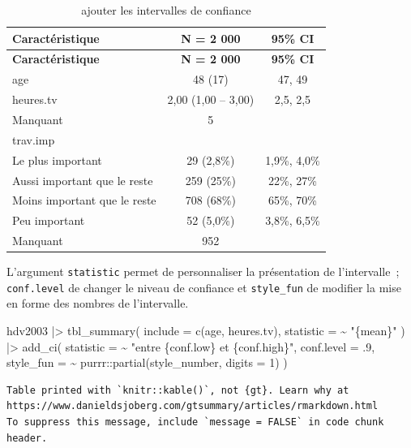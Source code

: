 \documentclass[
  letterpaper,
  DIV=11,
  numbers=noendperiod,
  oneside]{scrreprt}
\newenvironment{Shaded}{\begin{snugshade}}{\end{snugshade}}
\newcommand{\AttributeTok}[1]{\textcolor[rgb]{0.40,0.45,0.13}{#1}}
\newcommand{\DecValTok}[1]{\textcolor[rgb]{0.68,0.00,0.00}{#1}}
\newcommand{\FunctionTok}[1]{\textcolor[rgb]{0.28,0.35,0.67}{#1}}
\newcommand{\NormalTok}[1]{\textcolor[rgb]{0.00,0.23,0.31}{#1}}
\newcommand{\SpecialCharTok}[1]{\textcolor[rgb]{0.37,0.37,0.37}{#1}}
\newcommand{\StringTok}[1]{\textcolor[rgb]{0.13,0.47,0.30}{#1}}
\begin{document}
\hypertarget{tbl-add_ci}{}
\begin{longtable}[]{@{}lcc@{}}
\caption{\label{tbl-add_ci}ajouter les intervalles de
confiance}\tabularnewline
\toprule()
\textbf{Caractéristique} & \textbf{N = 2 000} & \textbf{95\% CI} \\
\midrule()
\endfirsthead
\toprule()
\textbf{Caractéristique} & \textbf{N = 2 000} & \textbf{95\% CI} \\
\midrule()
\endhead
age & 48 (17) & 47, 49 \\
heures.tv & 2,00 (1,00 -- 3,00) & 2,5, 2,5 \\
Manquant & 5 & \\
trav.imp & & \\
Le plus important & 29 (2,8\%) & 1,9\%, 4,0\% \\
Aussi important que le reste & 259 (25\%) & 22\%, 27\% \\
Moins important que le reste & 708 (68\%) & 65\%, 70\% \\
Peu important & 52 (5,0\%) & 3,8\%, 6,5\% \\
Manquant & 952 & \\
\bottomrule()
\end{longtable}

L'argument \texttt{statistic} permet de personnaliser la présentation de
l'intervalle~; \texttt{conf.level} de changer le niveau de confiance et
\texttt{style\_fun} de modifier la mise en forme des nombres de
l'intervalle.

\begin{Shaded}
\begin{Highlighting}[]
\NormalTok{hdv2003 }\SpecialCharTok{|\textgreater{}}
  \FunctionTok{tbl\_summary}\NormalTok{(}
    \AttributeTok{include =} \FunctionTok{c}\NormalTok{(age, heures.tv),}
    \AttributeTok{statistic =} \SpecialCharTok{\textasciitilde{}} \StringTok{"\{mean\}"}
\NormalTok{  ) }\SpecialCharTok{|\textgreater{}} 
  \FunctionTok{add\_ci}\NormalTok{(}
    \AttributeTok{statistic =} \SpecialCharTok{\textasciitilde{}} \StringTok{"entre \{conf.low\} et \{conf.high\}"}\NormalTok{,}
    \AttributeTok{conf.level =}\NormalTok{ .}\DecValTok{9}\NormalTok{,}
    \AttributeTok{style\_fun =} \SpecialCharTok{\textasciitilde{}}\NormalTok{ purrr}\SpecialCharTok{::}\FunctionTok{partial}\NormalTok{(style\_number, }\AttributeTok{digits =} \DecValTok{1}\NormalTok{)}
\NormalTok{  )}
\end{Highlighting}
\end{Shaded}

\begin{verbatim}
Table printed with `knitr::kable()`, not {gt}. Learn why at
https://www.danieldsjoberg.com/gtsummary/articles/rmarkdown.html
To suppress this message, include `message = FALSE` in code chunk header.
\end{verbatim}
\end{document}
